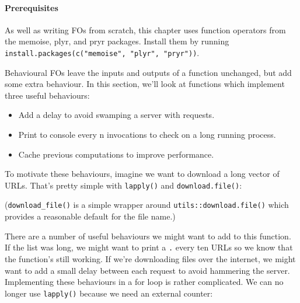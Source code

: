 \paragraph{Prerequisites}

As well as writing FOs from scratch, this chapter uses function
operators from the memoise, plyr, and pryr packages. Install them by
running \texttt{install.packages(c("memoise", "plyr", "pryr"))}.


Behavioural FOs leave the inputs and outputs of a function unchanged,
but add some extra behaviour. In this section, we'll look at functions
which implement three useful behaviours:

\begin{itemize}
\itemsep1pt\parskip0pt
\item
  Add a delay to avoid swamping a server with requests.
\item
  Print to console every n invocations to check on a long running
  process.
\item
  Cache previous computations to improve performance.
\end{itemize}

To motivate these behaviours, imagine we want to download a long vector
of URLs. That's pretty simple with \texttt{lapply()} and
\texttt{download.file()}:

\begin{Shaded}
\begin{Highlighting}[]
\StringTok{ }
\NormalTok{\}}
\end{Highlighting}
\end{Shaded}

(\texttt{download\_file()} is a simple wrapper around
\texttt{utils::download.file()} which provides a reasonable default for
the file name.)

There are a number of useful behaviours we might want to add to this
function. If the list was long, we might want to print a \texttt{.}
every ten URLs so we know that the function's still working. If we're
downloading files over the internet, we might want to add a small delay
between each request to avoid hammering the server. Implementing these
behaviours in a for loop is rather complicated. We can no longer use
\texttt{lapply()} because we need an external counter:

